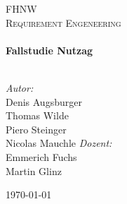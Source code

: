 \begin{titlepage}
\begin{center}
\textsc{\LARGE FHNW}\\[1.5cm]
\textsc{\Large Requirement Engeneering}\\[0.5cm]
\HRule \\[0.4cm]
{ \huge \bfseries Fallstudie Nutzag}\\[0.4cm]
\HRule \\[1.5cm]
\begin{minipage}{1.2\textwidth}
\begin{flushleft} \large
\emph{Autor:}\\
Denis Augsburger\\
Thomas Wilde\\
Piero Steinger\\
Nicolas Mauchle
\newline
\newline
\emph{Dozent:} \\
Emmerich Fuchs\\
Martin Glinz
\end{flushleft}
\end{minipage}
\vfill
{\large \today}
\end{center}
\end{titlepage}
